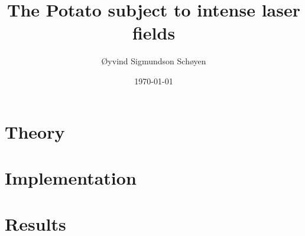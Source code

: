 \documentclass[twoside, english, notitlepage, 12pt]{uiofysmaster}
\author{Øyvind Sigmundson Schøyen}
\title{The Potato subject to intense laser fields}
\date{\today}
\begin{document}
\frontmatter
    \maketitle

    \begin{abstract}
        
    \end{abstract}

    \begin{acknowledgements}
        
    \end{acknowledgements}

    \tableofcontents

\mainmatter

    

    \part{Theory}
        
        

        
        
        

    \part{Implementation}
        

        

        

    \part{Results}
        
        
        
\end{document}
